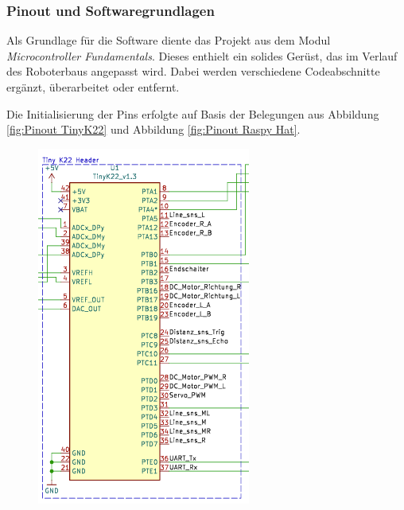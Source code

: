 \subsubsection{Pinout und Softwaregrundlagen}

Als Grundlage für die Software diente das Projekt aus dem Modul \textit{Microcontroller Fundamentals}. Dieses enthielt ein solides Gerüst, das im Verlauf des Roboterbaus angepasst wird. Dabei werden verschiedene Codeabschnitte ergänzt, überarbeitet oder entfernt.

Die Initialisierung der Pins erfolgte auf Basis der Belegungen aus Abbildung \ref{fig:Pinout TinyK22} und Abbildung \ref{fig:Pinout Raspy Hat}.

\begin{figure}[H]
\centering
\begin{minipage}[b]{0.45\textwidth}
  \centering
  \includegraphics[width=\textwidth]{assets/ET/Software/Tiny_Pinout.png}

\end{minipage}
\end{figure}
